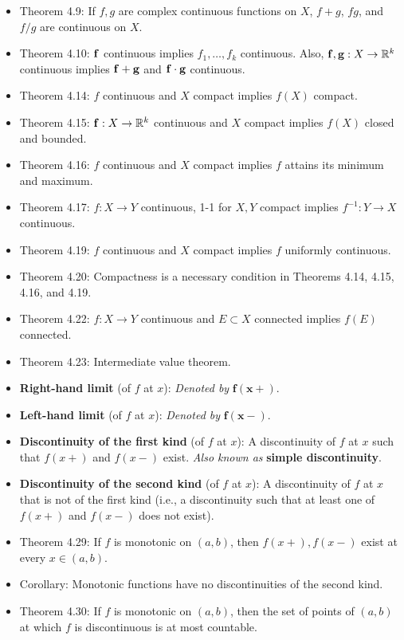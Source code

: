 \documentclass[../../notes.tex]{subfiles}
\begin{document}
\begin{itemize}
    \item Theorem 4.9: If $f,g$ are complex continuous functions on $X$, $f+g$, $fg$, and $f/g$ are continuous on $X$.
    \item Theorem 4.10: $\mathbf{f}$ continuous implies $f_1,\dots,f_k$ continuous. Also, $\mathbf{f},\mathbf{g}:X\to\mathbb{R}^k$ continuous implies $\mathbf{f}+\mathbf{g}$ and $\mathbf{f}\cdot\mathbf{g}$ continuous.
    \item {}Theorem 4.14: $f$ continuous and $X$ compact implies $f(X)$ compact.
    \item Theorem 4.15: $\mathbf{f}:X\to\mathbb{R}^k$ continuous and $X$ compact implies $f(X)$ closed and bounded.
    \item Theorem 4.16: $f$ continuous and $X$ compact implies $f$ attains its minimum and maximum.
    \item Theorem 4.17: $f:X\to Y$ continuous, 1-1 for $X,Y$ compact implies $f^{-1}:Y\to X$ continuous.
    \item Theorem 4.19: $f$ continuous and $X$ compact implies $f$ uniformly continuous.
    \item Theorem 4.20: Compactness is a necessary condition in Theorems 4.14, 4.15, 4.16, and 4.19.
    \item Theorem 4.22: $f:X\to Y$ continuous and $E\subset X$ connected implies $f(E)$ connected.
    \item Theorem 4.23: Intermediate value theorem.
    \item \textbf{Right-hand limit} (of $f$ at $x$): \emph{Denoted by} $\bm{f(x+)}$.
    \item \textbf{Left-hand limit} (of $f$ at $x$): \emph{Denoted by} $\bm{f(x-)}$.
    \item \textbf{Discontinuity of the first kind} (of $f$ at $x$): A discontinuity of $f$ at $x$ such that $f(x+)$ and $f(x-)$ exist. \emph{Also known as} \textbf{simple discontinuity}.
    \item \textbf{Discontinuity of the second kind} (of $f$ at $x$): A discontinuity of $f$ at $x$ that is not of the first kind (i.e., a discontinuity such that at least one of $f(x+)$ and $f(x-)$ does not exist).
    \item Theorem 4.29: If $f$ is monotonic on $(a,b)$, then $f(x+),f(x-)$ exist at every $x\in(a,b)$.
    \item Corollary: Monotonic functions have no discontinuities of the second kind.
    \item Theorem 4.30: If $f$ is monotonic on $(a,b)$, then the set of points of $(a,b)$ at which $f$ is discontinuous is at most countable.
\end{itemize}
\end{document}
